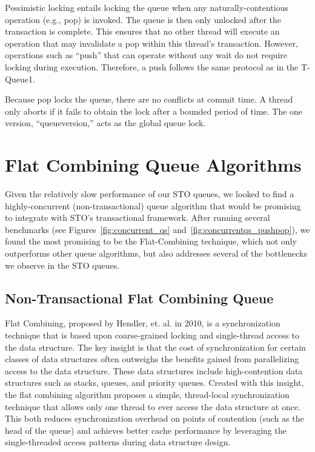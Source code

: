 Pessimistic locking entails locking the queue when any naturally-contentious operation (e.g., pop) is invoked. The queue is then only unlocked after the transaction is complete. This ensures that no other thread will execute an operation that may invalidate a pop within this thread's transaction. However, operations such as ``push'' that can operate without any wait do not require locking during execution. Therefore, a push follows the same protocol as in the T-Queue1.

Because pop locks the queue, there are no conflicts at commit time. A thread only aborts if it fails to obtain the lock after a bounded period of time. The one version, “queueversion,” acts as the global queue lock. 



\section{Flat Combining Queue Algorithms}
Given the relatively slow performance of our STO queues, we looked to find a highly-concurrent (non-transactional) queue algorithm that would be promising to integrate with STO's transactional framework. After running several benchmarks (see Figures~\ref{fig:concurrent_qs} and~\ref{fig:concurrentqs_pushpop}), we found the most promising to be the Flat-Combining technique, which not only outperforms other queue algorithms, but also addresses several of the bottlenecks we observe in the STO queues.

\subsection{Non-Transactional Flat Combining Queue}
\label{fcqueuent}


Flat Combining, proposed by Hendler, et. al. in 2010\cite{flatcombining}, is a synchronization technique that is based upon coarse-grained locking and single-thread access to the data structure. The key insight is that the cost of synchronization for certain classes of data structures often outweighs the benefits gained from parallelizing access to the data structure. These data structures include high-contention data structures such as stacks, queues, and priority queues. Created with this insight, the flat combining algorithm proposes a simple, thread-local synchronization technique that allows only one thread to ever access the data structure at once. This both reduces synchronization overhead on points of contention (such as the head of the queue) and achieves better cache performance by leveraging the single-threaded access patterns during data structure design.

